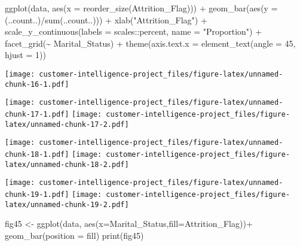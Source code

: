 \documentclass[
]{article}
\newenvironment{Shaded}{\begin{snugshade}}{\end{snugshade}}
\newcommand{\AttributeTok}[1]{\textcolor[rgb]{0.77,0.63,0.00}{#1}}
\newcommand{\DecValTok}[1]{\textcolor[rgb]{0.00,0.00,0.81}{#1}}
\newcommand{\FunctionTok}[1]{\textcolor[rgb]{0.00,0.00,0.00}{#1}}
\newcommand{\NormalTok}[1]{#1}
\newcommand{\OtherTok}[1]{\textcolor[rgb]{0.56,0.35,0.01}{#1}}
\newcommand{\SpecialCharTok}[1]{\textcolor[rgb]{0.00,0.00,0.00}{#1}}
\newcommand{\StringTok}[1]{\textcolor[rgb]{0.31,0.60,0.02}{#1}}
\begin{document}
\begin{Shaded}
\begin{Highlighting}[]
\FunctionTok{ggplot}\NormalTok{(data, }\FunctionTok{aes}\NormalTok{(}\AttributeTok{x =} \FunctionTok{reorder\_size}\NormalTok{(}\StringTok{\textasciigrave{}}\AttributeTok{Attrition\_Flag}\StringTok{\textasciigrave{}}\NormalTok{))) }\SpecialCharTok{+}
        \FunctionTok{geom\_bar}\NormalTok{(}\FunctionTok{aes}\NormalTok{(}\AttributeTok{y =}\NormalTok{ (..count..)}\SpecialCharTok{/}\FunctionTok{sum}\NormalTok{(..count..))) }\SpecialCharTok{+}
        \FunctionTok{xlab}\NormalTok{(}\StringTok{"Attrition\_Flag"}\NormalTok{) }\SpecialCharTok{+}
        \FunctionTok{scale\_y\_continuous}\NormalTok{(}\AttributeTok{labels =}\NormalTok{ scales}\SpecialCharTok{::}\NormalTok{percent, }\AttributeTok{name =} \StringTok{"Proportion"}\NormalTok{) }\SpecialCharTok{+}
        \FunctionTok{facet\_grid}\NormalTok{(}\SpecialCharTok{\textasciitilde{}}\NormalTok{ Marital\_Status) }\SpecialCharTok{+}
        \FunctionTok{theme}\NormalTok{(}\AttributeTok{axis.text.x =} \FunctionTok{element\_text}\NormalTok{(}\AttributeTok{angle =} \DecValTok{45}\NormalTok{, }\AttributeTok{hjust =} \DecValTok{1}\NormalTok{))}
\end{Highlighting}
\end{Shaded}

\texttt{[image: customer-intelligence-project\_files/figure-latex/unnamed-chunk-16-1.pdf]}

\texttt{[image: customer-intelligence-project\_files/figure-latex/unnamed-chunk-17-1.pdf]}
\texttt{[image: customer-intelligence-project\_files/figure-latex/unnamed-chunk-17-2.pdf]}

\texttt{[image: customer-intelligence-project\_files/figure-latex/unnamed-chunk-18-1.pdf]}
\texttt{[image: customer-intelligence-project\_files/figure-latex/unnamed-chunk-18-2.pdf]}

\texttt{[image: customer-intelligence-project\_files/figure-latex/unnamed-chunk-19-1.pdf]}
\texttt{[image: customer-intelligence-project\_files/figure-latex/unnamed-chunk-19-2.pdf]}

\begin{Shaded}
\begin{Highlighting}[]
\NormalTok{fig45 }\OtherTok{\textless{}{-}} \FunctionTok{ggplot}\NormalTok{(data, }\FunctionTok{aes}\NormalTok{(}\AttributeTok{x=}\NormalTok{Marital\_Status,}\AttributeTok{fill=}\NormalTok{Attrition\_Flag))}\SpecialCharTok{+} \FunctionTok{geom\_bar}\NormalTok{(}\AttributeTok{position =} \StringTok{\textquotesingle{}fill\textquotesingle{}}\NormalTok{)}
\FunctionTok{print}\NormalTok{(fig45)}
\end{Highlighting}
\end{Shaded}
\end{document}
